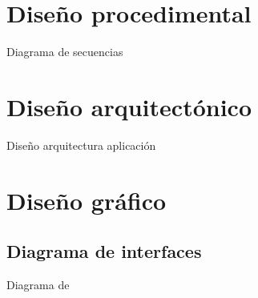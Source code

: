 \section{Diseño procedimental}

Diagrama de secuencias


\section{Diseño arquitectónico}

Diseño arquitectura aplicación

\section{Diseño gráfico}
\subsection{Diagrama de interfaces}

Diagrama de 